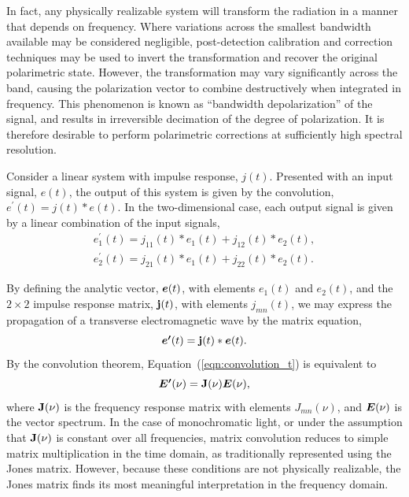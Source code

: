 \documentclass[twocolumn]{aastex6}
\newcommand{\mbf}[1]{\mbox{\boldmath $#1$}}
\newcommand{\Eqn}[1]{Equation~(\ref{eqn:#1})}
\begin{document}
\begin{appendix}
In fact, any physically realizable system will transform the radiation
in a manner that depends on frequency.  Where variations across the
smallest bandwidth available may be considered negligible,
post-detection calibration and correction techniques may be used to
invert the transformation and recover the original polarimetric state.
However, the transformation may vary significantly across the band,
causing the polarization vector to combine destructively when
integrated in frequency.  This phenomenon is known as ``bandwidth
depolarization'' of the signal, and results in irreversible decimation
of the degree of polarization.  It is therefore desirable to perform
polarimetric corrections at sufficiently high spectral resolution.

Consider a linear system with impulse response, $j(t)$.  Presented
with an input signal, $e(t)$, the output of this system is given by
the convolution, $e^\prime(t)=j(t)*e(t)$.  In the two-dimensional
case, each output signal is given by a linear combination of the input
signals,
\begin{eqnarray}
e_1^\prime(t)=j_{11}(t)*e_1(t) + j_{12}(t)*e_2(t), \\
e_2^\prime(t)=j_{21}(t)*e_1(t) + j_{22}(t)*e_2(t).
\end{eqnarray}

  By
defining the analytic vector, $\mbf{e}(t)$, with elements $e_1(t)$ and
$e_2(t)$, and the $2\times2$ impulse response matrix, ${\bf{j}}(t)$,
with elements $j_{mn}(t)$, we may express the propagation of a
transverse electromagnetic wave by the matrix equation,
\begin{equation}
{\mbf{e^\prime}}(t)={\bf{j}}(t)*\mbf{e}(t).
\label{eqn:convolution_t}
\end{equation}
By the convolution theorem, \Eqn{convolution_t} is equivalent to
\begin{equation}
\mbf{E^\prime}(\nu)={\bf J}(\nu)\mbf{E}(\nu),
\label{eqn:convolution_nu}
\end{equation}
where $\bf{J}(\nu)$ is the frequency response matrix with elements
$J_{mn}(\nu)$, and $\mbf{E}(\nu)$ is the vector spectrum.  In the case
of monochromatic light, or under the assumption that $\bf{J}(\nu)$ is
constant over all frequencies, matrix convolution reduces to simple
matrix multiplication in the time domain, as traditionally represented
using the Jones matrix.  However, because these conditions are not
physically realizable, the Jones matrix finds its most meaningful
interpretation in the frequency domain.


\end{appendix}
\end{document}
